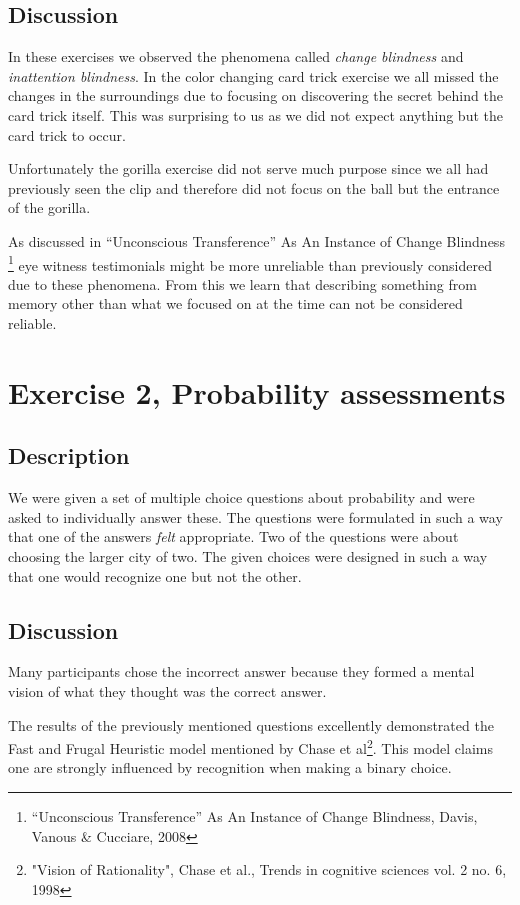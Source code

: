 \documentclass[10pt, a4paper]{article}
\begin{document}
\subsection{Discussion}
In these exercises we observed the phenomena called \emph{change blindness} and \emph{inattention blindness}. In the color changing card trick exercise we all missed the changes in the surroundings due to focusing on discovering the secret behind the card trick itself. This was surprising to us as we did not expect anything but the card trick to occur. 

Unfortunately the gorilla exercise did not serve much purpose since we all had previously seen the clip and therefore did not focus on the ball but the entrance of the gorilla. 

As discussed in “Unconscious Transference” As An Instance of Change Blindness \footnote{“Unconscious Transference” As An Instance of Change Blindness, Davis, Vanous \& Cucciare, 2008} eye witness testimonials might be more unreliable than previously considered due to these phenomena. From this we learn that describing something from memory other than what we focused on at the time can not be considered reliable. 

\section{Exercise 2, Probability assessments}
\subsection{Description}
We were given a set of multiple choice questions about probability and were asked to individually answer these. 
The questions were formulated in such a way that one of the answers \emph{felt} appropriate.
Two of the questions were about choosing the larger city of two. The given choices were designed in such a way that one would recognize one but not the other. 

\subsection{Discussion}
Many participants chose the incorrect answer because they formed a mental vision of what they thought was the correct answer. 

The results of the previously mentioned questions excellently demonstrated the Fast and Frugal Heuristic model mentioned by Chase et al\footnote{"Vision of Rationality", Chase et al., Trends in cognitive sciences vol. 2 no. 6, 1998}. This model claims one are strongly influenced by recognition when making a binary choice. 
\end{document}
